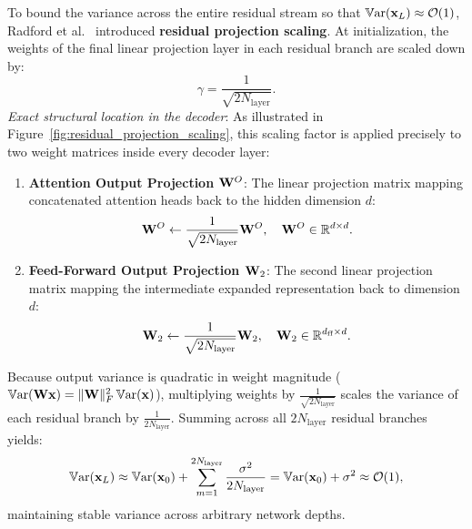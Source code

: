 \documentclass[../../main.tex]{subfiles}
\begin{document}
To bound the variance across the entire residual stream so that $\operatorname{\mathbb{V}\mathrm{ar}}(\mathbf{x}_L) \approx \mathcal{O}(1)$, Radford et al.~\cite{radford2019} introduced \textbf{residual projection scaling}. At initialization, the weights of the final linear projection layer in each residual branch are scaled down by:
\begin{equation}
\label{eq:residual_scaling}
\gamma = \frac{1}{\sqrt{2 N_{\text{layer}}}}.
\end{equation}
\textit{Exact structural location in the decoder}: As illustrated in Figure~\ref{fig:residual_projection_scaling}, this scaling factor is applied precisely to two weight matrices inside every decoder layer:
\begin{enumerate}
    \item \textbf{Attention Output Projection $\mathbf{W}^O$}: The linear projection matrix mapping concatenated attention heads back to the hidden dimension $d$:
    \begin{equation}
    \label{eq:wo_scaled_init}
    \mathbf{W}^O \leftarrow \frac{1}{\sqrt{2 N_{\text{layer}}}} \mathbf{W}^O, \quad \mathbf{W}^O \in \mathbb{R}^{d \times d}.
    \end{equation}
    \item \textbf{Feed-Forward Output Projection $\mathbf{W}_2$}: The second linear projection matrix mapping the intermediate expanded representation back to dimension $d$:
    \begin{equation}
    \label{eq:w2_scaled_init}
    \mathbf{W}_2 \leftarrow \frac{1}{\sqrt{2 N_{\text{layer}}}} \mathbf{W}_2, \quad \mathbf{W}_2 \in \mathbb{R}^{d_{\text{ff}} \times d}.
    \end{equation}
\end{enumerate}
Because output variance is quadratic in weight magnitude ($\operatorname{\mathbb{V}\mathrm{ar}}(\mathbf{W} \mathbf{x}) = \|\mathbf{W}\|_F^2 \operatorname{\mathbb{V}\mathrm{ar}}(\mathbf{x})$), multiplying weights by $\frac{1}{\sqrt{2 N_{\text{layer}}}}$ scales the variance of each residual branch by $\frac{1}{2 N_{\text{layer}}}$. Summing across all $2 N_{\text{layer}}$ residual branches yields:
\begin{equation}
\label{eq:scaled_variance_bound}
\operatorname{\mathbb{V}\mathrm{ar}}(\mathbf{x}_L) \approx \operatorname{\mathbb{V}\mathrm{ar}}(\mathbf{x}_0) + \sum_{m=1}^{2 N_{\text{layer}}} \frac{\sigma^2}{2 N_{\text{layer}}} = \operatorname{\mathbb{V}\mathrm{ar}}(\mathbf{x}_0) + \sigma^2 \approx \mathcal{O}(1),
\end{equation}
maintaining stable variance across arbitrary network depths.
\end{document}
